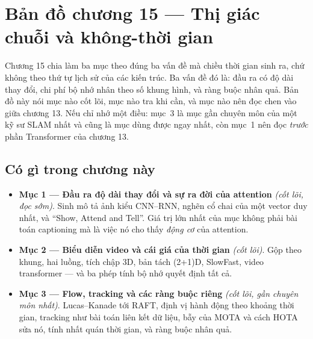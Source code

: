 \documentclass[../../deep_learning.tex]{subfiles}
\begin{document}
\section*{Bản đồ chương 15 --- Thị giác chuỗi và không-thời gian}

\begin{tomtat}
Chương 15 chia làm ba mục theo đúng ba vấn đề mà chiều thời gian sinh ra, chứ không theo thứ tự lịch sử của các kiến trúc. Ba vấn đề đó là: đầu ra có độ dài thay đổi, chi phí bộ nhớ nhân theo số khung hình, và ràng buộc nhân quả. Bản đồ này nói mục nào cốt lõi, mục nào tra khi cần, và mục nào nên đọc chen vào giữa chương 13. Nếu chỉ nhớ một điều: mục~3 là mục gần chuyên môn của một kỹ sư SLAM nhất và cũng là mục dùng được ngay nhất, còn mục~1 nên đọc \emph{trước} phần Transformer của chương 13.
\end{tomtat}

\begin{nentang}
\end{nentang}

\subsection*{Có gì trong chương này}

\begin{itemize}
\item \textbf{Mục 1 --- Đầu ra độ dài thay đổi và sự ra đời của attention} \emph{(cốt lõi, đọc sớm)}. Sinh mô tả ảnh kiểu CNN--RNN, nghẽn cổ chai của một vector duy nhất, và ``Show, Attend and Tell''. Giá trị lớn nhất của mục không phải bài toán captioning mà là việc nó cho thấy \emph{động cơ} của attention.
\item \textbf{Mục 2 --- Biểu diễn video và cái giá của thời gian} \emph{(cốt lõi)}. Gộp theo khung, hai luồng, tích chập 3D, bản tách (2+1)D, SlowFast, video transformer --- và ba phép tính bộ nhớ quyết định tất cả.
\item \textbf{Mục 3 --- Flow, tracking và các ràng buộc riêng} \emph{(cốt lõi, gần chuyên môn nhất)}. Lucas--Kanade tới RAFT, định vị hành động theo khoảng thời gian, tracking như bài toán liên kết dữ liệu, bẫy của MOTA và cách HOTA sửa nó, tính nhất quán thời gian, và ràng buộc nhân quả.
\end{itemize}
\end{document}
